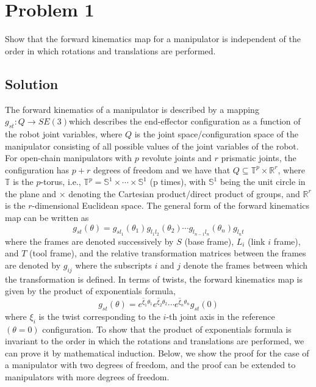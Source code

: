 \section*{Problem 1}
\setcounter{section}{1}
\setcounter{equation}{0}

Show that the forward kinematics map for a manipulator is independent of the order in which rotations and translations are performed.

\subsection*{Solution}

The forward kinematics of a manipulator is described by a mapping \( g_{st} : Q \to SE (3) \)which describes the end-eﬀector configuration as a function of the robot joint variables, where \( Q \) is the joint space/configuration space of the manipulator consisting of all possible values of the joint variables of the robot.
For open-chain manipulators with \( p \) revolute joints and \( r \) prismatic joints, the configuration has \( p+r \) degrees of freedom and we have that \( Q \subseteq \mathbb{T}^{p} \times \mathbb{R}^{r} \), where \( \mathbb{T} \) is the \(p\)-torus, i.e., \( \mathbb{T}^{p} = \mathbb{S}^{1} \times \cdots \times \mathbb{S}^{1} \) (p times), with \( \mathbb{S}^{1} \) being the unit circle in the plane and \( \times \) denoting the Cartesian product/direct product of groups, and \( \mathbb{R}^{r} \) is the \(r\)-dimensional Euclidean space.
The general form of the forward kinematics map can be written as
\begin{equation}
    g_{st}(\theta)
    =
    g_{s l_1}(\theta_1)
    g_{l_1 l_2}(\theta_2)
    \cdots
    g_{l_{n-1} l_n}(\theta_n)
    g_{l_n t}
\end{equation}
where the frames are denoted successively by \( S \) (base frame), \( L_i \) (link \(i\) frame), and \( T \) (tool frame), and the relative transformation matrices between the frames are denoted by \( g_{ij} \) where the subscripts \( i \) and \( j \) denote the frames between which the transformation is defined.
In terms of twists, the forward kinematics map is given by the product of exponentials formula,
\begin{equation}
    g_{st}(\theta)
    =
    e^{\widehat{\xi}_1 \theta_1}
    e^{\widehat{\xi}_2 \theta_2}
    \cdots
    e^{\widehat{\xi}_n \theta_n}
    g_{st}(0)
\end{equation}
where \( \xi_{i} \) is the twist corresponding to the \(i\)-th joint axis in the reference \( (\theta = 0) \) conﬁguration.
To show that the product of exponentials formula is invariant to the order in which the rotations and translations are performed, we can prove it by mathematical induction.
Below, we show the proof for the case of a manipulator with two degrees of freedom, and the proof can be extended to manipulators with more degrees of freedom.

